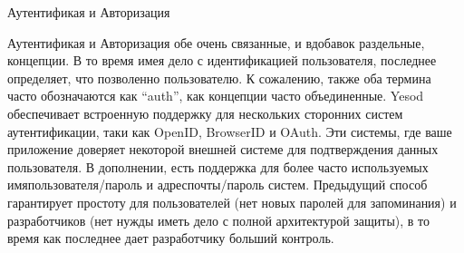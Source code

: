 Аутентификая и Авторизация

Аутентификая и Авторизация обе очень связанные, и вдобавок раздельные, концепции. В то время имея дело с идентификацией пользователя, последнее определяет, что позволенно пользователю. К сожалению, также оба термина часто обозначаются как \textquotedblleft auth\textquotedblright, как концепции часто объединенные.
Yesod обеспечивает встроенную поддержку для нескольких сторонних систем аутентификации, таки как OpenID, BrowserID и OAuth. Эти системы, где ваше приложение доверяет некоторой внешней системе для подтверждения данных пользователя. В дополнении, есть поддержка для более часто используемых имяпользователя/пароль и адреспочты/пароль систем. Предыдущий способ гарантирует простоту для пользователей (нет новых паролей для запоминания) и разработчиков (нет нужды иметь дело с полной архитектурой защиты), в то время как последнее дает разработчику больший контроль.